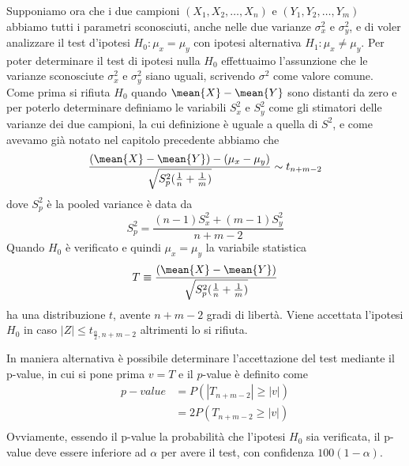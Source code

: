Supponiamo ora che i due campioni $(X_1, X_2, \dots, X_n)$ e $(Y_1, Y_2, \dots, Y_m)$ abbiamo tutti i parametri
sconosciuti, anche nelle due varianze $\sigma_x^2$ e $\sigma_y^2$, e di voler analizzare il test d'ipotesi 
$H_0:\mu_x = \mu_y$ con ipotesi alternativa $H_1:\mu_x \neq \mu_y$.\newline
Per poter determinare il test di ipotesi nulla $H_0$ effettuaimo l'assunzione che le varianze sconosciute $\sigma_x^2$ 
e $\sigma_y^2$ siano uguali, scrivendo $\sigma^2$ come valore comune.\mewline
Come prima si rifiuta $H_0$ quando $\mean{X} - \mean{Y}$ sono distanti da zero e per poterlo determinare definiamo 
le variabili $S_x^2$ e $S_y^2$ come gli stimatori delle varianze dei due campioni, la cui definizione è uguale a quella
di $S^2$, e come avevamo già notato nel capitolo precedente abbiamo che
\[ \frac{(\mean{X} - \mean{Y}) - (\mu_x - \mu_y)}{\sqrt{S^2_p(\frac{1}{n} + \frac{1}{m})}} \sim t_{n + m - 2} \]
dove $S_p^2$ è la pooled variance è data da 
\[ S_p^2 = \frac{(n-1)S^2_x + (m - 1)S^2_y}{n + m - 2} \]
Quando $H_0$ è verificato e quindi $\mu_x = \mu_y$ la variabile statistica 
\[ T \equiv \frac{(\mean{X} - \mean{Y})}{\sqrt{S^2_p(\frac{1}{n} + \frac{1}{m})}} \]
ha una distribuzione $t$, avente $n + m - 2$ gradi di libertà.\newline
Viene accettata l'ipotesi $H_0$ in caso $|Z| \leq t_{\frac{\alpha}{2}, n + m - 2}$ altrimenti lo si rifiuta.

In maniera alternativa è possibile determinare l'accettazione del test mediante il p-value, in cui si pone prima $v = T$
e il $p$-value è definito come
\[ \begin{split} 
    p-value & = P(|T_{n + m -2}| \geq |v|) \\
            & = 2P(T_{n + m -2} \geq |v|)\\
   \end{split} \]
Ovviamente, essendo il p-value la probabilità che l'ipotesi $H_0$ sia verificata, il p-value deve essere inferiore ad
$\alpha$ per avere il test, con confidenza $100(1 - \alpha)$.


